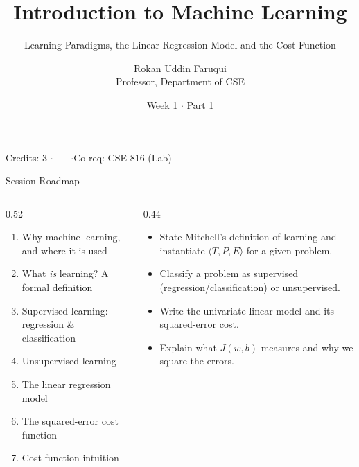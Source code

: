 \documentclass[aspectratio=169,10pt]{beamer}
\title[CSE 815 -- Week 1, Part 1]{Introduction to Machine Learning}
\subtitle{Learning Paradigms, the Linear Regression Model and the Cost Function}
\author{Rokan Uddin Faruqui\\ \small Professor, Department of CSE}
\institute{\small University of Chittagong \\ \texttt{rufaruqui@cu.ac.bd}}
\date[Week 1 / Part 1]{Week 1 $\cdot$ Part 1}
\begin{document}
\begin{frame}
  \titlepage
  \begin{center}
    \footnotesize\color{cugray}
    Credits: 3 \quad$\cdot$\quad  ----- \quad$\cdot$\quad Co-req: CSE 816 (Lab)
  \end{center}
\end{frame}

\begin{frame}{Session Roadmap}
  \begin{columns}[T,onlytextwidth]
    \begin{column}{0.52\textwidth}
      \small
      \begin{enumerate}
        \item Why machine learning, and where it is used  
        \item What \emph{is} learning? A formal definition  
        \item Supervised learning: regression \& classification  
        \item Unsupervised learning  
        \item The linear regression model  
        \item The squared-error cost function  
        \item Cost-function intuition  
      \end{enumerate}
    \end{column}
    \begin{column}{0.44\textwidth}
      \begin{keyidea}
        \small
        \begin{itemize}
          \item State Mitchell's definition of learning and instantiate $\langle T,P,E\rangle$ for a given problem.
          \item Classify a problem as supervised (regression/classification) or unsupervised.
          \item Write the univariate linear model and its squared-error cost.
          \item Explain what $J(w,b)$ measures and why we square the errors.
        \end{itemize}
      \end{keyidea}
    \end{column}
  \end{columns}
\end{frame}
\end{document}
